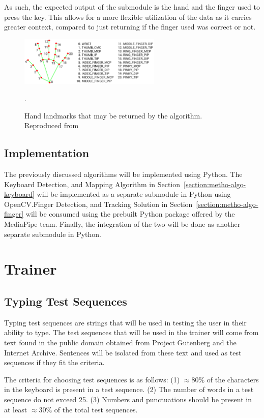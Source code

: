 \documentclass{report}
\begin{document}
As such, the expected output of the submodule is the hand and the finger used to
press the key. This allows for a more flexible utilization of the data as it
carries greater context, compared to just returning if the finger used was
correct or not.

\begin{figure}[H]
	\centering
	\includegraphics[width=0.6\textwidth]{hand-landmarks.png}
	\caption{Hand landmarks that may be returned by the algorithm. Reproduced from }.
	\label{fig:metho-algo-integration-landmarks}
	\centering
\end{figure}

\subsection{Implementation}
\label{section:metho-algo-implementation}
The previously discussed algorithms will be implemented using Python. The
Keyboard Detection, and Mapping Algorithm in
Section~\ref{section:metho-algo-keyboard} will be implemented as a separate
submodule in Python using OpenCV.\@The Finger Detection, and Tracking Solution
in Section~\ref{section:metho-algo-finger} will be consumed using the prebuilt
Python package offered by the MediaPipe team. Finally, the integration of the
two will be done as another separate submodule in Python.

\section{Trainer}

\subsection{Typing Test Sequences}
Typing test sequences are strings that will be used in testing the user in their
ability to type. The test sequences that will be used in the trainer will come
from text found in the public domain obtained from Project Gutenberg and the
Internet Archive. Sentences will be isolated from these text and used as test
sequences if they fit the criteria.

The criteria for choosing test sequences is as follows: (1) $\approx80\%$ of the
characters in the keyboard is present in a test sequence. (2) The number of
words in a test sequence do not exceed 25. (3) Numbers and punctuations should
be present in at least $\approx30\%$ of the total test sequences.
\end{document}
